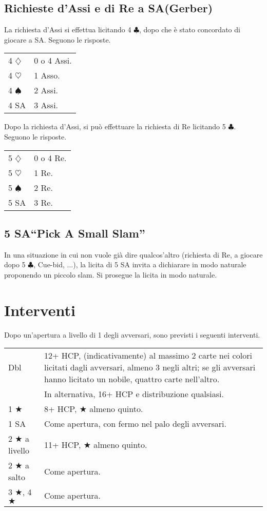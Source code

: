 \documentclass[a4paper,10pt]{article}
\renewcommand{\c}{$\clubsuit$\xspace}
\renewcommand{\d}{$\diamondsuit$\xspace}
\newcommand{\h}{$\heartsuit$\xspace}
\newcommand{\s}{$\spadesuit$\xspace}
\renewcommand{\j}{$\bigstar$\xspace}
\newcommand{\sa}{SA\xspace}
\newcommand{\smallspace}{\vskip0.3cm}
\newenvironment{twocol}
  {\smallspace\noindent\begin{tabular}{l p{0.78\textwidth}}}
  {\end{tabular}\smallspace}
\begin{document}
\subsection{Richieste d'Assi e di Re a \sa (Gerber)}

La richiesta d'Assi si effettua licitando 4 \c, dopo che è stato concordato di giocare a \sa. Seguono le risposte.
\begin{twocol}
  4 \d & 0 o 4 Assi.\\
  4 \h & 1 Asso.\\
  4 \s & 2 Assi.\\
  4 \sa & 3 Assi.
\end{twocol}

\noindent Dopo la richiesta d'Assi, si può effettuare la richiesta di Re licitando 5 \c. Seguono le risposte.
\begin{twocol}
  5 \d & 0 o 4 Re.\\
  5 \h & 1 Re.\\
  5 \s & 2 Re.\\
  5 \sa & 3 Re.
\end{twocol}


\subsection{5 \sa ``Pick A Small Slam''}

In una situazione in cui non vuole già dire qualcos'altro (richiesta di Re, a giocare dopo 5 \c, Cue-bid, ...), la licita di 5 \sa invita a dichiarare in modo naturale proponendo un piccolo slam. Si prosegue la licita in modo naturale.



\pagebreak
\section{Interventi}

Dopo un'apertura a livello di 1 degli avversari, sono previsti i seguenti interventi.

\begin{twocol}
  Dbl & 12+ HCP, (indicativamente) al massimo 2 carte nei colori licitati dagli avversari, almeno 3 negli altri; se gli avversari hanno licitato un nobile, quattro carte nell'altro. \\
  & In alternativa, 16+ HCP e distribuzione qualsiasi.\\
  1 \j & 8+ HCP, \j almeno quinto.\\
  1 \sa & Come apertura, con fermo nel palo degli avversari.\\
  2 \j a livello & 11+ HCP, \j almeno quinto.\\
  2 \j a salto & Come apertura.\\
  3 \j, 4 \j & Come apertura.
\end{twocol}
\end{document}
